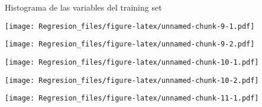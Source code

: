 \documentclass[]{article}
\newenvironment{Shaded}{\begin{snugshade}}{\end{snugshade}}
\newcommand{\DataTypeTok}[1]{\textcolor[rgb]{0.13,0.29,0.53}{#1}}
\newcommand{\KeywordTok}[1]{\textcolor[rgb]{0.13,0.29,0.53}{\textbf{#1}}}
\newcommand{\NormalTok}[1]{#1}
\newcommand{\OperatorTok}[1]{\textcolor[rgb]{0.81,0.36,0.00}{\textbf{#1}}}
\newcommand{\StringTok}[1]{\textcolor[rgb]{0.31,0.60,0.02}{#1}}
\begin{document}
Histograma de las variables del training set

\begin{Shaded}
\end{Shaded}

\texttt{[image: Regresion\_files/figure-latex/unnamed-chunk-9-1.pdf]}

\begin{Shaded}
\end{Shaded}

\texttt{[image: Regresion\_files/figure-latex/unnamed-chunk-9-2.pdf]}

\begin{Shaded}
\end{Shaded}

\texttt{[image: Regresion\_files/figure-latex/unnamed-chunk-10-1.pdf]}

\begin{Shaded}
\end{Shaded}

\texttt{[image: Regresion\_files/figure-latex/unnamed-chunk-10-2.pdf]}

\begin{Shaded}
\end{Shaded}

\texttt{[image: Regresion\_files/figure-latex/unnamed-chunk-11-1.pdf]}
\end{document}
